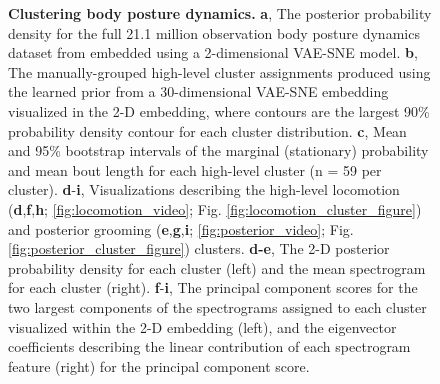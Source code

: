 \documentclass[11pt,a4paper,twoside]{book}
\begin{document}
\begin{doublespace}
\begin{figure}[!htb]
\caption{  \textbf{Clustering body posture dynamics.} \textbf{a}, The posterior probability density for the full 21.1 million observation body posture dynamics dataset from \cite{berman2014mapping, berman2016predictability, pereira2019fast} embedded using a 2-dimensional VAE-SNE model. \textbf{b}, The manually-grouped high-level cluster assignments produced using the learned prior from a 30-dimensional VAE-SNE embedding visualized in the 2-D embedding, where contours are the largest 90\% probability density contour for each cluster distribution. \textbf{c}, Mean and 95\% bootstrap intervals of the marginal (stationary) probability and mean bout length for each high-level cluster (n = 59 per cluster). \textbf{d}-\textbf{i}, Visualizations describing the high-level locomotion (\textbf{d},\textbf{f},\textbf{h}; \ref{fig:locomotion_video}; Fig. \ref{fig:locomotion_cluster_figure}) and posterior grooming (\textbf{e},\textbf{g},\textbf{i}; \ref{fig:posterior_video}; Fig. \ref{fig:posterior_cluster_figure}) clusters. \textbf{d-e}, The 2-D posterior probability density for each cluster (left) and the mean spectrogram for each cluster (right). \textbf{f}-\textbf{i}, The principal component scores for the two largest components of the spectrograms assigned to each cluster visualized within the 2-D embedding (left), and the eigenvector coefficients describing the linear contribution of each spectrogram feature (right) for the principal component score.}
\label{fig:cluster_figure}
\end{figure}



\end{doublespace}
\end{document}
